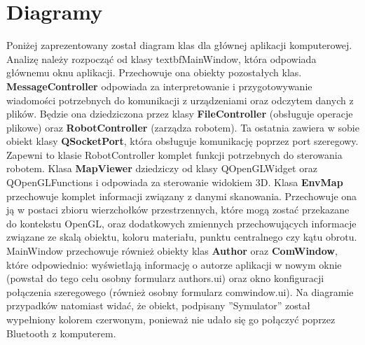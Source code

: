 \documentclass[a4paper,12pt]{article}
\begin{document}
\section{Diagramy}
Poniżej zaprezentowany został diagram klas dla głównej aplikacji komputerowej. 
Analizę należy rozpocząć od klasy textbf{MainWindow}, która odpowiada głównemu oknu aplikacji. Przechowuje ona obiekty pozostałych klas. 
\textbf{MessageController} odpowiada za interpretowanie i przygotowywanie wiadomości potrzebnych do komunikacji z urządzeniami oraz odczytem danych z plików.
Będzie ona dziedziczona przez klasy \textbf{FileController} (obsługuje operacje plikowe) oraz \textbf{RobotController} (zarządza robotem). Ta ostatnia zawiera w sobie obiekt klasy \textbf{QSocketPort}, która obsługuje komunikację poprzez port szeregowy. Zapewni to klasie RobotController komplet funkcji potrzebnych
do sterowania robotem. 
Klasa \textbf{MapViewer} dziedziczy od klasy QOpenGLWidget oraz QOpenGLFunctions i odpowiada za sterowanie widokiem 3D.
Klasa \textbf{EnvMap} przechowuje komplet informacji związany z danymi skanowania. Przechowuje ona ją w postaci zbioru wierzchołków przestrzennych, które mogą zostać przekazane do kontekstu OpenGL, oraz dodatkowych zmiennych przechowujących informacje związane ze skalą obiektu, koloru materiału, punktu centralnego czy kątu obrotu.
\newline
MainWindow przechowuje również obiekty klas \textbf{Author} oraz \textbf{ComWindow}, które odpowiednio: wyświetlają informację o autorze aplikacji w nowym oknie (powstał do tego celu osobny formularz authors.ui) oraz okno konfiguracji połączenia szeregowego (również osobny formularz comwindow.ui). \newline
Na diagramie przypadków natomiast widać, że obiekt, podpisany ''Symulator'' został wypełniony kolorem czerwonym, ponieważ nie udało się go połączyć poprzez Bluetooth z komputerem.  




\end{document}
